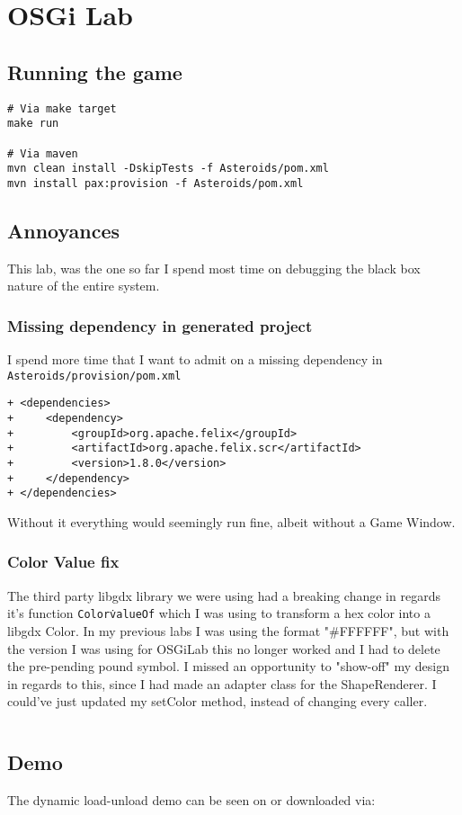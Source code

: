 \section{OSGi Lab}

\subsection{Running the game}
\begin{verbatim}
# Via make target
make run

# Via maven
mvn clean install -DskipTests -f Asteroids/pom.xml
mvn install pax:provision -f Asteroids/pom.xml
\end{verbatim}

\subsection{Annoyances}

This lab, was the one so far I spend most time on debugging the black box nature
of the entire system.

\subsubsection{Missing dependency in generated project}

I spend more time that I want to admit on a missing dependency in \texttt{Asteroids/provision/pom.xml}
\begin{verbatim}
+ <dependencies>
+     <dependency>
+         <groupId>org.apache.felix</groupId>
+         <artifactId>org.apache.felix.scr</artifactId>
+         <version>1.8.0</version>
+     </dependency>
+ </dependencies>
\end{verbatim}

Without it everything would seemingly run fine, albeit without a Game Window.

\subsubsection{Color Value fix}
The third party libgdx library we were using had a breaking change in regards
it's function \texttt{Color\.valueOf} which I was using to transform a hex color
into a libgdx Color. In my previous labs I was using the format "\#FFFFFF", but
with the version I was using for OSGiLab this no longer worked and I had to
delete the pre-pending pound symbol.
I missed an opportunity to "show-off" my design in regards to this, since I had
made an adapter class for the ShapeRenderer. I could've just updated my setColor
method, instead of changing every caller.

\inputminted{java}{code/color-value-fix.java}


\subsection{Demo}
The dynamic load-unload demo can be seen on
 or downloaded via:
